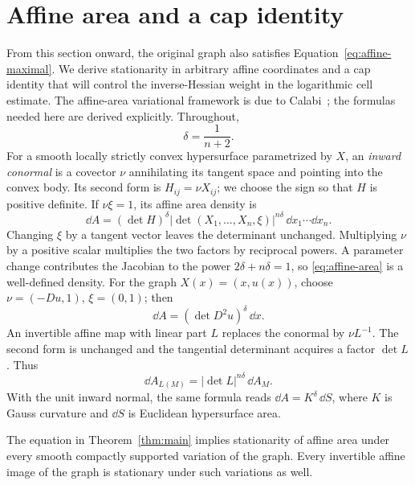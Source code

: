 \section{Affine area and a cap identity}\label{sec:area}

From this section onward, the original graph also satisfies
Equation~\eqref{eq:affine-maximal}. We derive stationarity in
arbitrary affine coordinates and a cap identity that will control the
inverse-Hessian weight in the logarithmic cell estimate. The affine-area
variational framework is due to Calabi~\cite{Calabi1982}; the formulas
needed here are derived explicitly. Throughout,
\[
 \delta=\frac1{n+2}.
\]
For a smooth locally strictly convex hypersurface parametrized by \(X\),
an \emph{inward conormal} is a covector \(\nu\) annihilating its tangent
space and pointing into the convex body. Its second form is
\(H_{ij}=\nu X_{ij}\); we choose the sign so that \(H\) is positive
definite. If \(\nu\xi=1\), its affine area density is
\begin{equation}\label{eq:affine-area}
 \dd A=(\det H)^\delta
 \bigl|\det(X_1,\ldots,X_n,\xi)\bigr|^{n\delta}
 \,\dd x_1\cdots\dd x_n.
\end{equation}
Changing \(\xi\) by a tangent vector leaves the determinant unchanged.
Multiplying \(\nu\) by a positive scalar multiplies the two factors by
reciprocal powers. A parameter change contributes the Jacobian to the
power \(2\delta+n\delta=1\), so \eqref{eq:affine-area} is a well-defined
density. For the graph \(X(x)=(x,u(x))\), choose
\(\nu=(-Du,1)\), \(\xi=(0,1)\); then
\[
 \dd A=(\det D^2u)^\delta\,\dd x.
\]
An invertible affine map with linear part \(L\) replaces the conormal
by \(\nu L^{-1}\). The second form is unchanged and the tangential
determinant acquires a factor \(\det L\). Thus
\begin{equation}\label{eq:area-covariance}
 \dd A_{L(M)}=|\det L|^{n\delta}\,\dd A_M.
\end{equation}
With the unit inward normal, the same formula reads
\(\dd A=K^\delta\,\dd S\), where \(K\) is Gauss curvature and
\(\dd S\) is Euclidean hypersurface area.

\begin{lemma}[Stationarity]\label{lem:stationarity}
The equation in Theorem~\ref{thm:main} implies stationarity of affine
area under every smooth compactly supported variation of the graph.
Every invertible affine image of the graph is stationary under such
variations as well.
\end{lemma}

